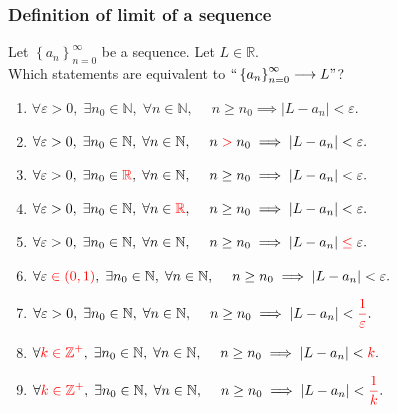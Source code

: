 \documentclass[14pt]{beamer}
\begin{document}
\begin{frame}[t]
	\fontsize{13}{13}\selectfont
	\frametitle{Definition of limit of a sequence}

	Let $\displaystyle \left\{ a_{n} \right\}_{n=0}^{\infty}$ be a sequence. Let
	$\displaystyle L \in \mathbb{R}$. \\ Which statements are equivalent to $\displaystyle
	``\left\{ a_{n} \right\}_{n=0}^{\infty}\longrightarrow L"$?

	\begin{enumerate}
		\item $\displaystyle \forall \varepsilon>0, \; \exists n_{0}\in \mathbb{N}, \;
			\forall n \in \mathbb{N}, \; \quad n \geq n_{0}\implies |L-a_{n}| < \varepsilon
			.$

		\item $\displaystyle \forall \varepsilon>0, \; \exists n_{0}\in \mathbb{N}, \;
			\forall n \in \mathbb{N}, \; \quad n \;{\color{red} > }\; n_{0}\implies |L-
			a_{n}| < \varepsilon.$

		\item $\displaystyle \forall \varepsilon>0, \; \exists n_{0}\in{\color{red} \mathbb{R}}
			, \; \forall n \in \mathbb{N}, \; \quad n \geq n_{0}\implies |L-a_{n}| < \varepsilon
			.$

		\item $\displaystyle \forall \varepsilon>0, \; \exists n_{0}\in \mathbb{N}, \;
			\forall n \in{\color{red} \mathbb{R}}, \; \quad n \geq n_{0}\implies |L-a_{n}
			| < \varepsilon.$

		\item $\displaystyle \forall \varepsilon>0, \; \exists n_{0}\in \mathbb{N}, \;
			\forall n \in \mathbb{N}, \; \quad n \geq n_{0}\implies |L-a_{n}| \;{\color{red} \leq}
			\; \varepsilon.$

		\item $\displaystyle \forall \varepsilon \;{\color{red} \in (0,1)}, \; \exists
			n_{0}\in \mathbb{N}, \; \forall n \in \mathbb{N}, \; \quad n \geq n_{0}\implies
			|L-a_{n}| < \varepsilon.$

		\item $\displaystyle \forall \varepsilon>0, \; \exists n_{0}\in \mathbb{N}, \;
			\forall n \in \mathbb{N}, \; \quad n \geq n_{0}\implies |L-a_{n}| <{\color{red} \frac{1}{\varepsilon}}
			.$

		\item $\displaystyle \forall{\color{red} k \in \mathbb{Z}^{+}}, \; \exists n_{0}
			\in \mathbb{N}, \; \forall n \in \mathbb{N}, \; \quad n \geq n_{0}\implies
			|L-a_{n}| <{\color{red} k}.$

		\item $\displaystyle \forall{\color{red} k \in \mathbb{Z}^{+}}, \; \exists n_{0}
			\in \mathbb{N}, \; \forall n \in \mathbb{N}, \; \quad n \geq n_{0}\implies
			|L-a_{n}| <{\color{red} \frac{1}{k}}.$
	\end{enumerate}
\end{frame}
\end{document}
